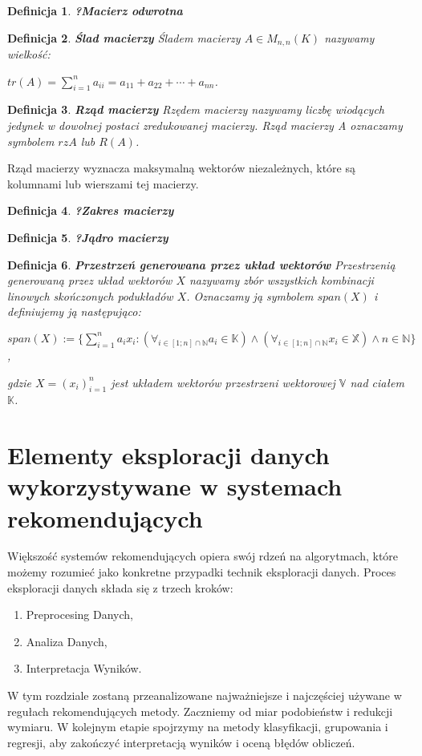 \documentclass[12pt,a4paper]{report}
\newtheorem{df}{Definicja}[chapter]
\begin{document}
\begin{df}\textbf{?Macierz odwrotna}
\end{df}

\begin{df}\textbf{Ślad macierzy}
Śladem macierzy  $A\in M_{n,n}(K)$ nazywamy wielkość:
\begin{center}
$tr(A) = \sum_{i=1}^n a_{ii} = a_{11} + a_{22} + \cdots + a_{nn}$.
\end{center}
\end{df}
\begin{df}\textbf{Rząd macierzy}%
Rzędem macierzy nazywamy liczbę wiodących jedynek w dowolnej postaci zredukowanej macierzy. Rząd macierzy A oznaczamy symbolem $rz A$ lub $R(A)$.
\end{df}
Rząd macierzy wyznacza maksymalną wektorów niezależnych, które są kolumnami lub wierszami tej macierzy.
\begin{df}\textbf{?Zakres macierzy}
\end{df}
\begin{df}\textbf{?Jądro macierzy}
\end{df}
\begin{df}\textbf{Przestrzeń generowana przez układ wektorów}
Przestrzenią generowaną przez układ wektorów $X$ nazywamy zbór wszystkich kombinacji linowych skończonych podukładów $X$.
Oznaczamy ją symbolem $span(X)$ i definiujemy ją następująco:
\begin{center}
$span(X) := \{\sum_{i=1}^n a_i x_i : (\forall_{i\in [1;n]\cap \mathbb{N}} a_i \in \mathbb{K}) \wedge (\forall_{i\in [1;n]\cap \mathbb{N}} x_i \in \mathbb{X}) \wedge n \in \mathbb{N}\}$,
\end{center}
gdzie $X = (x_i)_{i=1}^n$ jest układem wektorów przestrzeni wektorowej $\mathbb{V}$ nad ciałem $\mathbb{K}$.
\end{df}

\chapter{Elementy eksploracji danych wykorzystywane w systemach rekomendujących}
Większość systemów rekomendujących opiera swój rdzeń na algorytmach, które możemy rozumieć jako konkretne przypadki technik eksploracji danych. 
Proces eksploracji danych składa się z trzech kroków:
\begin{enumerate}
\item Preprocesing Danych,
\item Analiza Danych,
\item Interpretacja Wyników.
\end{enumerate}
W tym rozdziale zostaną przeanalizowane najważniejsze i najczęściej używane w regułach rekomendujących metody. Zaczniemy od miar podobieństw i redukcji wymiaru. W kolejnym etapie spojrzymy na metody klasyfikacji, grupowania i regresji, aby zakończyć interpretacją wyników i oceną błędów obliczeń.
\end{document}
